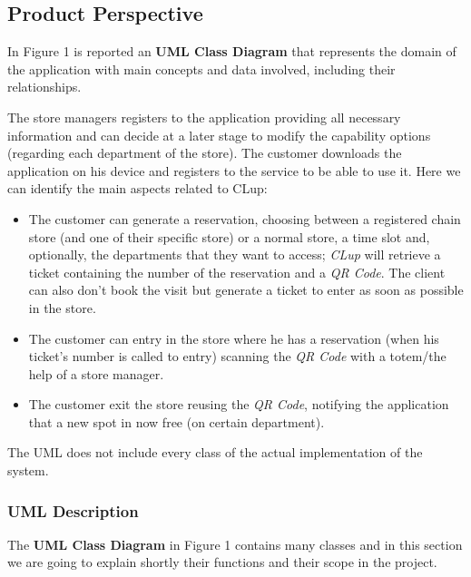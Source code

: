 \documentclass{article}
\begin{document}
	\subsection{Product Perspective}
	
	
	In Figure 1 is reported an {\bfseries UML Class Diagram} that represents the domain of the application with main concepts and data involved, including their relationships.
	
	The store managers registers to the application providing all necessary information and can decide at a later stage to modify the capability options (regarding each department of the store). The customer downloads the application on his device and registers to the service to be able to use it. Here we can identify the main aspects related to CLup:
	
	\begin{itemize}
		
		\item The customer can generate a reservation, choosing between a registered chain store (and one of their specific store) or a normal store, a time slot and, optionally, the departments that they want to access; \emph{CLup} will retrieve a ticket containing the number of the reservation and a \emph{QR Code}. The client can also don't book the visit but generate a ticket to enter as soon as possible in the store.
		
		\item The customer can entry in the store where he has a reservation (when his ticket's number is called to entry) scanning the \emph{QR Code} with a totem/the help of a store manager.
		
		\item The customer exit the store reusing the \emph{QR Code}, notifying the application that a new spot in now free (on certain department).
		
	\end{itemize}

	The UML does not include every class of the actual implementation of the system.
		
		\subsubsection{UML Description}
		
			The {\bfseries UML Class Diagram} in Figure 1 contains many classes and in this section we are going to explain shortly their functions and their scope in the project.
			
\end{document}
